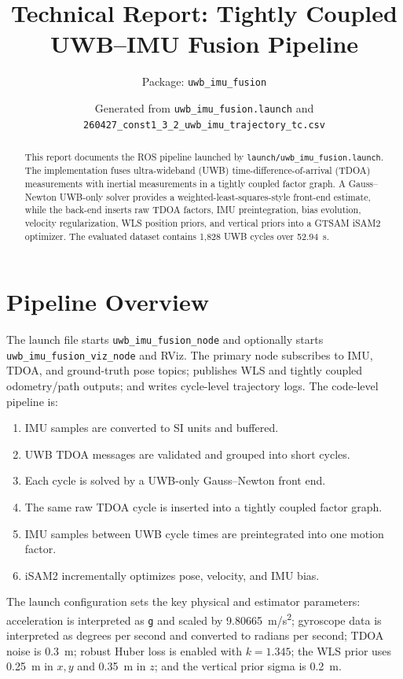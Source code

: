 \documentclass[11pt,a4paper]{article}
\title{Technical Report: Tightly Coupled UWB--IMU Fusion Pipeline}
\author{Package: \texttt{uwb\_imu\_fusion}}
\date{Generated from \texttt{uwb\_imu\_fusion.launch} and \texttt{260427\_const1\_3\_2\_uwb\_imu\_trajectory\_tc.csv}}
\begin{document}
\maketitle

\begin{abstract}
This report documents the ROS pipeline launched by \texttt{launch/uwb\_imu\_fusion.launch}. The implementation fuses ultra-wideband (UWB) time-difference-of-arrival (TDOA) measurements with inertial measurements in a tightly coupled factor graph. A Gauss--Newton UWB-only solver provides a weighted-least-squares-style front-end estimate, while the back-end inserts raw TDOA factors, IMU preintegration, bias evolution, velocity regularization, WLS position priors, and vertical priors into a GTSAM iSAM2 optimizer. The evaluated dataset contains 1,828 UWB cycles over \SI{52.94}{s}.
\end{abstract}

\section{Pipeline Overview}

The launch file starts \texttt{uwb\_imu\_fusion\_node} and optionally starts \texttt{uwb\_imu\_fusion\_viz\_node} and RViz. The primary node subscribes to IMU, TDOA, and ground-truth pose topics; publishes WLS and tightly coupled odometry/path outputs; and writes cycle-level trajectory logs. The code-level pipeline is:

\begin{enumerate}[leftmargin=*]
  \item IMU samples are converted to SI units and buffered.
  \item UWB TDOA messages are validated and grouped into short cycles.
  \item Each cycle is solved by a UWB-only Gauss--Newton front end.
  \item The same raw TDOA cycle is inserted into a tightly coupled factor graph.
  \item IMU samples between UWB cycle times are preintegrated into one motion factor.
  \item iSAM2 incrementally optimizes pose, velocity, and IMU bias.
\end{enumerate}

The launch configuration sets the key physical and estimator parameters: acceleration is interpreted as \texttt{g} and scaled by \SI{9.80665}{m/s^2}; gyroscope data is interpreted as degrees per second and converted to radians per second; TDOA noise is \SI{0.3}{m}; robust Huber loss is enabled with \(k=1.345\); the WLS prior uses \SI{0.25}{m} in \(x,y\) and \SI{0.35}{m} in \(z\); and the vertical prior sigma is \SI{0.2}{m}.
\end{document}
